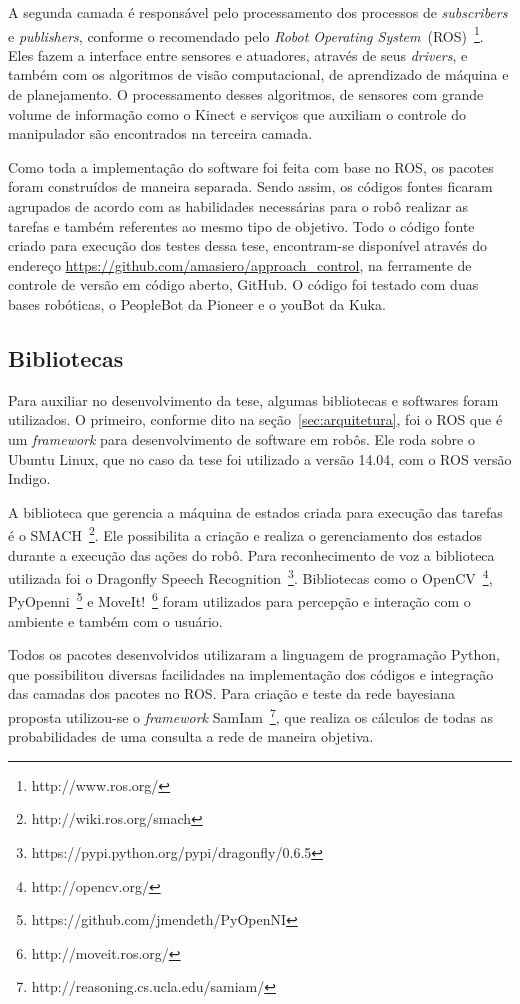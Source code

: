 A segunda camada é responsável pelo processamento dos processos de \emph{subscribers} e \emph{publishers}, conforme o recomendado pelo \emph{Robot Operating System}~(ROS)~\footnote{http://www.ros.org/}. Eles fazem a interface entre sensores e atuadores, através de seus \emph{drivers}, e também com os algoritmos de visão computacional, de aprendizado de máquina e de planejamento. O processamento desses algoritmos, de sensores com grande volume de informação como o Kinect e serviços que auxiliam o controle do manipulador são encontrados na terceira camada.

Como toda a implementação do software foi feita com base no ROS, os pacotes foram construídos de maneira separada. Sendo assim, os códigos fontes ficaram agrupados de acordo com as habilidades necessárias para o robô realizar as tarefas e também referentes ao mesmo tipo de objetivo. Todo o código fonte criado para execução dos testes dessa tese, encontram-se disponível através do endereço \url{https://github.com/amasiero/approach_control}, na ferramente de controle de versão em código aberto, GitHub. O código foi testado com duas bases robóticas, o PeopleBot da Pioneer e o youBot da Kuka.

\subsection{Bibliotecas}
\label{sec:bibliotecas}
Para auxiliar no desenvolvimento da tese, algumas bibliotecas e softwares foram utilizados. O primeiro, conforme dito na seção~\ref{sec:arquitetura}, foi o ROS que é um \emph{framework} para desenvolvimento de software em robôs. Ele roda sobre o Ubuntu Linux, que no caso da tese foi utilizado a versão 14.04, com o ROS versão Indigo.

A biblioteca que gerencia a máquina de estados criada para execução das tarefas é o SMACH~\footnote{http://wiki.ros.org/smach}. Ele possibilita a criação e realiza o gerenciamento dos estados durante a execução das ações do robô. Para reconhecimento de voz a biblioteca utilizada foi o Dragonfly Speech Recognition~\footnote{https://pypi.python.org/pypi/dragonfly/0.6.5}. Bibliotecas como o OpenCV~\footnote{http://opencv.org/}, PyOpenni~\footnote{https://github.com/jmendeth/PyOpenNI} e MoveIt!~\footnote{http://moveit.ros.org/} foram utilizados para percepção e interação com o ambiente e também com o usuário.

Todos os pacotes desenvolvidos utilizaram a linguagem de programação Python, que possibilitou diversas facilidades na implementação dos códigos e integração das camadas dos pacotes no ROS. Para criação e teste da rede bayesiana proposta utilizou-se o \emph{framework} SamIam~\footnote{http://reasoning.cs.ucla.edu/samiam/}, que realiza os cálculos de todas as probabilidades de uma consulta a rede de maneira objetiva.

